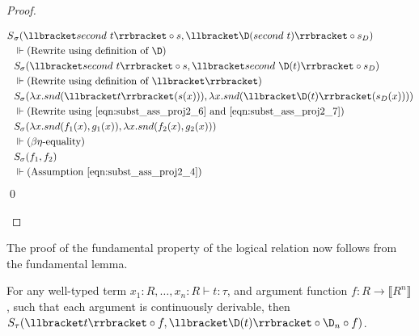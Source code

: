 \begin{proof}
\begin{enumerate}
      \begin{align*}
        S&_{\sigma}(\llbracket second\ t \rrbracket \circ s, \llbracket \D(second\ t) \rrbracket \circ s_D) \\
        & \Vdash \text{(Rewrite using definition of $\D$)} \\
        & S_{\sigma}(\llbracket second\ t \rrbracket \circ s, \llbracket second\ \D(t) \rrbracket \circ s_D) \\
        & \Vdash \text{(Rewrite using definition of $\llbracket\rrbracket$)} \\
        & S_{\sigma}(\lambda x. snd(\llbracket t \rrbracket(s(x))), \lambda x. snd(\llbracket \D(t) \rrbracket(s_D(x)))) \\
        & \Vdash \text{(Rewrite using \ref{eqn:subst_ass_proj2_6} and \ref{eqn:subst_ass_proj2_7})} \\
        & S_{\sigma}(\lambda x. snd(f_1(x), g_1(x)), \lambda x. snd(f_2(x), g_2(x))) \\
        & \Vdash \text{($\beta\eta$-equality)} \\
        & S_{\sigma}(f_1, f_2) \\
        & \Vdash \text{(Assumption \ref{eqn:subst_ass_proj2_4})} \\
      \end{align*} \qed
    \end{enumerate}
  \end{proof}

  The proof of the fundamental property of the logical relation now follows from the fundamental lemma.

  \begin{lemma}\label{thm:fundamental_property}
    For any well-typed term $x_1 : R, \dots, x_n : R \vdash t : \tau$, and argument function $f : R \rightarrow \llbracket R^n \rrbracket$, such that each argument is continuously derivable, then $S_\tau(\llbracket t\rrbracket \circ f, \llbracket \D(t)\rrbracket \circ \D_n \circ f)$.
  \end{lemma}

